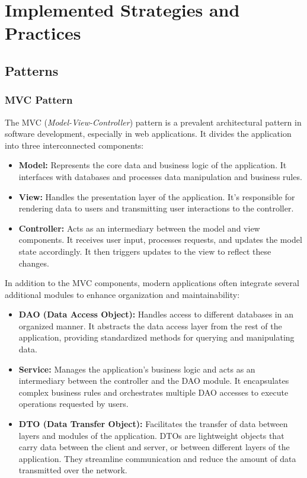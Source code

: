 \section{Implemented Strategies and Practices}
\subsection*{Patterns}

\subsubsection*{MVC Pattern}

The MVC (\textit{Model-View-Controller}) pattern is a prevalent architectural pattern in software development, especially in web 
applications. It divides the application into three interconnected components:

\begin{itemize}
\item \textbf{Model:} Represents the core data and business logic of the application. It interfaces with databases and processes 
data manipulation and business rules.

\item \textbf{View:} Handles the presentation layer of the application. It's responsible for rendering data to users and 
transmitting user interactions to the controller.

\item \textbf{Controller:} Acts as an intermediary between the model and view components. It receives user input, 
processes requests, and updates the model state accordingly. It then triggers updates to the view to reflect these changes.
\end{itemize}

\vspace{\baselineskip}

In addition to the MVC components, modern applications often integrate several additional modules to enhance organization and maintainability:

\begin{itemize}
\item \textbf{DAO (Data Access Object):} Handles access to different databases in an organized manner. It abstracts the data
access layer from the rest of the application, providing standardized methods for querying and manipulating data.

\item \textbf{Service:} Manages the application's business logic and acts as an intermediary between the controller and the 
DAO module. It encapsulates complex business rules and orchestrates multiple DAO accesses to execute operations requested by users.

\item \textbf{DTO (Data Transfer Object):} Facilitates the transfer of data between layers and modules of the application. 
DTOs are lightweight objects that carry data between the client and server, or between different layers of the application. 
They streamline communication and reduce the amount of data transmitted over the network.
\end{itemize}

